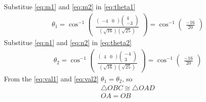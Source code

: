 \documentclass[10pt,a4paper]{article}
\newcommand{\myvec}[1]{\ensuremath{\begin{pmatrix}#1\end{pmatrix}}}
\begin{document}
Substitue \eqref{eq:m1} and \eqref{eq:m2} in \eqref{eq:theta1}
\begin{align}
    \theta_1 =\cos^{-1}\myvec{\frac{\myvec{-4&0}\myvec{4\\-3}}{(\sqrt{16})(\sqrt{25})}}=\cos^{-1}\myvec{\frac{-16}{20}}
    \label{eq:val1}
\end{align}
Substitue \eqref{eq:n1} and \eqref{eq:n2} in \eqref{eq:theta2}
\begin{align}
    \theta_2 =\cos^{-1}\myvec{\frac{\myvec{4&0}\myvec{-4\\3}}{(\sqrt{16})(\sqrt{25})}}=\cos^{-1}\myvec{\frac{-16}{20}}
    \label{eq:val2}
\end{align}
From the \eqref{eq:val1} and \eqref{eq:val2} $\theta_1=\theta_2$, so
\begin{align}
    \triangle{OBC} \cong \triangle{OAD}\\
    OA = OB
\end{align}
\end{document}
